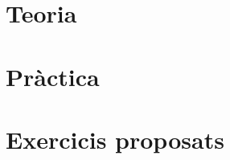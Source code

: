 \documentclass[12pt,a4paper,oneside]{book}
\newif\ifpublicacioparcial
\newif\ifimprimible
\begin{document}
\ifimprimible\pagecolor{white}\else\pagecolor{fons!20}\fi
\hypermetadata

\frontmatter
\maketitle

\tableofcontents
\let\cleardoublepage\clearpage



\mainmatter



\part{Teoria}
\setcounter{chapter}{0}



\ifpublicacioparcial\else







\fi

\part{Pràctica}
\setcounter{chapter}{0}



\ifpublicacioparcial\else






\fi

\part{Exercicis proposats}
\setcounter{chapter}{0}



\ifpublicacioparcial\else






\fi
\end{document}
